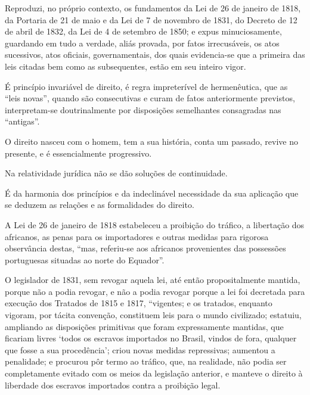 \asterisc

Reproduzi, no próprio contexto, os fundamentos da Lei de 26 de janeiro
de 1818, da Portaria de 21 de maio e da Lei de 7 de novembro de 1831, do
Decreto de 12 de abril de 1832, da Lei de 4 de setembro de 1850; e expus
minuciosamente, guardando em tudo a verdade, aliás provada, por fatos
irrecusáveis, os atos sucessivos, atos oficiais, governamentais, dos
quais evidencia-se que a primeira das leis citadas bem como as
subsequentes, estão em seu inteiro vigor.

É princípio invariável de direito, é regra impreterível de hermenêutica,
que as ``leis novas'', quando são consecutivas e curam de fatos
anteriormente previstos, interpretam-se doutrinalmente por disposições
semelhantes consagradas nas ``antigas''.

O direito nasceu com o homem, tem a sua história, conta um passado,
revive no presente, e é essencialmente progressivo.

Na relatividade jurídica não se dão soluções de continuidade.

É da harmonia dos princípios e da indeclinável necessidade da sua
aplicação que se deduzem as relações e as formalidades do direito.

A Lei de 26 de janeiro de 1818 estabeleceu a proibição do tráfico, a
libertação dos africanos, as penas para os importadores e outras medidas
para rigorosa observância destas, ``mas, referiu-se aos africanos
provenientes das possessões portuguesas situadas ao norte do Equador''.

O legislador de 1831, sem revogar aquela lei, até então propositalmente
mantida, porque não a podia revogar, e não a podia revogar porque a lei
foi decretada para execução dos Tratados de 1815 e 1817, ``vigentes; e os %
tratados, enquanto vigoram, por tácita convenção, constituem leis para o
mundo civilizado; estatuiu, ampliando as disposições primitivas que
foram expressamente mantidas, que ficariam livres `todos os escravos
importados no Brasil, vindos de fora, qualquer que fosse a sua
procedência'; criou novas medidas repressivas; aumentou a penalidade; e
procurou pôr termo ao tráfico, que, na realidade, não podia ser
completamente evitado com os meios da legislação anterior, e manteve o
direito à liberdade dos escravos importados contra a proibição legal.

